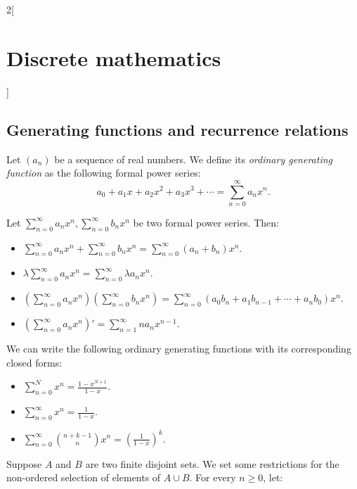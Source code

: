 \documentclass[class=article,10pt,crop=false]{standalone}
\begin{document}
\begin{multicols}{2}[\section{Discrete mathematics}]
\subsection{Generating functions and recurrence relations}
\begin{definition}
Let $(a_n)$ be a sequence of real numbers. We define its \textit{ordinary generating function} as the following formal power series: $$a_0+a_1x+a_2x^2+a_3x^3+\cdots=\sum_{n=0}^\infty a_nx^n.$$
\end{definition}
\begin{prop}
Let $\displaystyle\sum_{n=0}^\infty a_nx^n,\sum_{n=0}^\infty b_nx^n$ be two formal power series. Then:
\begin{itemize}
    \item $\displaystyle\sum_{n=0}^\infty a_nx^n+\sum_{n=0}^\infty b_nx^n=\sum_{n=0}^\infty (a_n+b_n)x^n$.
    \item $\displaystyle\lambda\sum_{n=0}^\infty a_nx^n=\sum_{n=0}^\infty\lambda a_nx^n$.
    \item $\displaystyle\left(\sum_{n=0}^\infty a_nx^n\right)\left(\sum_{n=0}^\infty b_nx^n\right)=\sum_{n=0}^\infty (a_0b_n+a_1b_{n-1}+\cdots +a_nb_0)x^n$.
    \item $\displaystyle\left(\sum_{n=0}^\infty a_nx^n\right)'=\sum_{n=1}^\infty na_nx^{n-1}$.
\end{itemize}
\end{prop}
\begin{prop}
We can write the following ordinary generating functions with its corresponding closed forms:
\begin{itemize}
    \item $\displaystyle\sum_{n=0}^Nx^n=\frac{1-x^{N+1}}{1-x}$.
    \item $\displaystyle\sum_{n=0}^\infty x^n=\frac{1}{1-x}$.
    \item $\displaystyle\sum_{n=0}^\infty\binom{n+k-1}{n}x^n=\left(\frac{1}{1-x}\right)^k$.
\end{itemize}
\end{prop}
\begin{prop}
Suppose $A$ and $B$ are two finite disjoint sets. We set some restrictions for the non-ordered selection of elements of $A\cup B$. For every $n\geq 0$, let:
\begin{itemize}

\end{itemize}
\end{prop}
\end{multicols}
\end{document}
